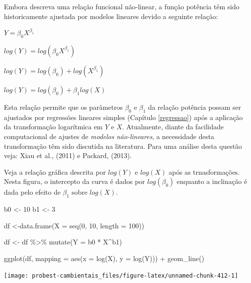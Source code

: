 \documentclass[
]{book}
\newenvironment{Shaded}{\begin{snugshade}}{\end{snugshade}}
\newcommand{\AttributeTok}[1]{\textcolor[rgb]{0.77,0.63,0.00}{#1}}
\newcommand{\DecValTok}[1]{\textcolor[rgb]{0.00,0.00,0.81}{#1}}
\newcommand{\FunctionTok}[1]{\textcolor[rgb]{0.00,0.00,0.00}{#1}}
\newcommand{\NormalTok}[1]{#1}
\newcommand{\OtherTok}[1]{\textcolor[rgb]{0.56,0.35,0.01}{#1}}
\newcommand{\SpecialCharTok}[1]{\textcolor[rgb]{0.00,0.00,0.00}{#1}}
\begin{document}
Embora descreva uma relação funcional não-linear, a função potência têm sido historicamente ajustada por modelos lineares devido a seguinte relação:

\(Y = \beta_{0}X^{\beta_{1}}\)

\(log(Y) = log(\beta_{0}X^{\beta_{1}})\)

\(log(Y) = log(\beta_{0}) + log(X^{\beta_{1}})\)

\(log(Y) = log(\beta_{0}) + \beta_{1}log(X)\)

Esta relação permite que os parâmetros \(\beta_0\) e \(\beta_1\) da relação potência possam ser ajustados por regressões lineares simples (Capítulo \ref{regressao}) após a aplicação da transformação logarítmica em \(Y\) e \(X\). Atualmente, diante da facilidade computacional de ajustes de \emph{modelos não-lineares}, a necessidade desta transformação têm sido discutida na literatura. Para uma análise desta questão veja: Xiau et al., (2011) e Packard, (2013).

Veja a relação gráfica descrita por \(log(Y)\) e \(log(X)\) após as trnasformações. Nesta figura, o intercepto da curva é dados por \(log(\beta_0)\) enquanto a inclinação é dada pelo efeito de \(\beta_1\) sobre \(log(X)\).

\begin{Shaded}
\begin{Highlighting}[]
\NormalTok{b0 }\OtherTok{\textless{}{-}} \DecValTok{10}
\NormalTok{b1 }\OtherTok{\textless{}{-}} \DecValTok{3}

\NormalTok{df }\OtherTok{\textless{}{-}}\FunctionTok{data.frame}\NormalTok{(}\AttributeTok{X =} \FunctionTok{seq}\NormalTok{(}\DecValTok{0}\NormalTok{, }\DecValTok{10}\NormalTok{, }\AttributeTok{length =} \DecValTok{100}\NormalTok{))}

\NormalTok{df }\OtherTok{\textless{}{-}}\NormalTok{ df }\SpecialCharTok{\%\textgreater{}\%} \FunctionTok{mutate}\NormalTok{(}\AttributeTok{Y =}\NormalTok{ b0 }\SpecialCharTok{*}\NormalTok{ X}\SpecialCharTok{\^{}}\NormalTok{b1)}

\FunctionTok{ggplot}\NormalTok{(df, }\AttributeTok{mapping =} \FunctionTok{aes}\NormalTok{(}\AttributeTok{x =} \FunctionTok{log}\NormalTok{(X), }\AttributeTok{y =} \FunctionTok{log}\NormalTok{(Y))) }\SpecialCharTok{+}
  \FunctionTok{geom\_line}\NormalTok{()}
\end{Highlighting}
\end{Shaded}

\begin{center}\texttt{[image: probest-cambientais\_files/figure-latex/unnamed-chunk-412-1]} \end{center}
\end{document}
